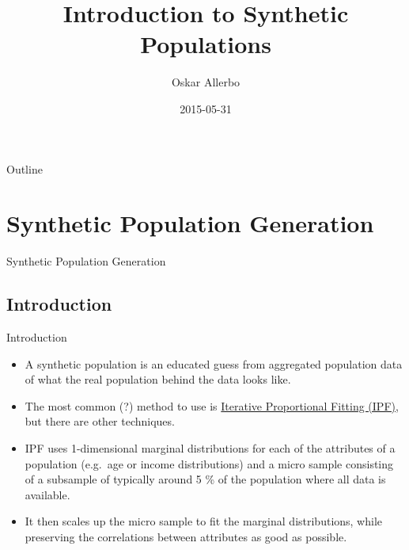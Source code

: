 \documentclass{beamer}
\title[Synthetic Populations]{Introduction to Synthetic Populations}
\author{Oskar Allerbo}
\institute{CoeGSS / Chalmers}
\date{2015-05-31}
\begin{document}
\begin{frame}
  \titlepage
\end{frame}


\begin{frame}{Outline}
  \tableofcontents
\end{frame}

\section{Synthetic Population Generation}
\begin{frame}
  \centering
  \LARGE
  Synthetic Population Generation
\end{frame}

\subsection{Introduction}
\begin{frame}{Introduction}
\begin{itemize}
\item A synthetic population is an educated guess from aggregated
  population data of what the real population behind the data looks
  like.
\item The most common (?) method to use is
  \href{https://en.wikipedia.org/wiki/Iterative_proportional_fitting}{Iterative
    Proportional Fitting (IPF)}, but there are other techniques.
\item IPF uses 1-dimensional marginal distributions for each of the
  attributes of a population (e.g.\ age or income distributions) and a
  micro sample consisting of a subsample of typically around 5 \% of
  the population where all data is available.
\item It then scales up the micro sample to fit the marginal
  distributions, while preserving the correlations between attributes
  as good as possible.
\end{itemize}
\end{frame}
\end{document}
